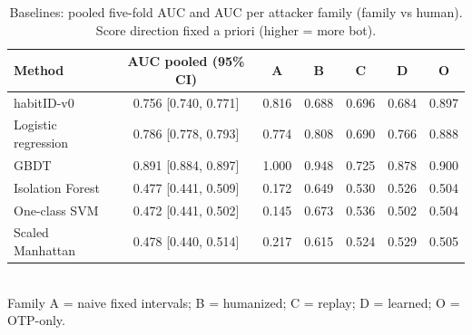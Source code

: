 \begin{table}[t]
\caption{Baselines: pooled five-fold AUC and AUC per attacker family (family vs human). Score direction fixed a priori (higher = more bot).}
\label{tab:baseline_families}
\centering
\small
\begin{tabular}{lcccccc}
\toprule
Method & AUC pooled (95\% CI) & A & B & C & D & O \\
\midrule
habitID-v0 & 0.756 [0.740, 0.771] & 0.816 & 0.688 & 0.696 & 0.684 & 0.897 \\
Logistic regression & 0.786 [0.778, 0.793] & 0.774 & 0.808 & 0.690 & 0.766 & 0.888 \\
GBDT & 0.891 [0.884, 0.897] & 1.000 & 0.948 & 0.725 & 0.878 & 0.900 \\
Isolation Forest & 0.477 [0.441, 0.509] & 0.172 & 0.649 & 0.530 & 0.526 & 0.504 \\
One-class SVM & 0.472 [0.441, 0.502] & 0.145 & 0.673 & 0.536 & 0.502 & 0.504 \\
Scaled Manhattan & 0.478 [0.440, 0.514] & 0.217 & 0.615 & 0.524 & 0.529 & 0.505 \\
\bottomrule
\end{tabular}
\\[2pt]\footnotesize Family A = naive fixed intervals; B = humanized; C = replay; D = learned; O = OTP-only.
\end{table}
